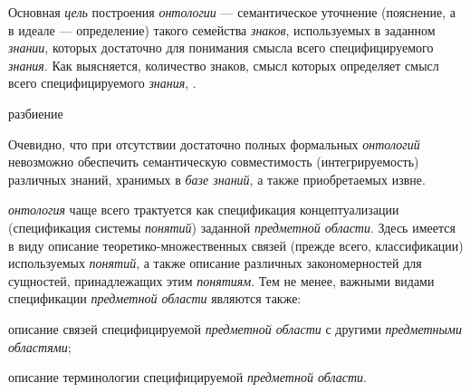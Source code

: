Основная \textit{цель} построения \textit{онтологии} --- семантическое уточнение (пояснение, а в идеале --- определение) такого семейства \textit{знаков}, используемых в заданном \textit{знании}, которых достаточно для понимания смысла всего специфицируемого \textit{знания}. Как выясняется, количество знаков, смысл которых определяет смысл всего специфицируемого \textit{знания}, .

\begin{SCn}
	\begin{scnrelfromset}{разбиение}
		\begin{scnindent}
		\end{scnindent}
	\end{scnrelfromset}
\end{SCn}

Очевидно, что при отсутствии достаточно полных формальных \textit{онтологий} невозможно обеспечить семантическую совместимость (интегрируемость) различных знаний, хранимых в \textit{базе знаний}, а также приобретаемых извне.

\textit{онтология} чаще всего трактуется как спецификация концептуализации (спецификация системы \textit{понятий}) заданной \textit{предметной области}. Здесь имеется в виду описание теоретико-множественных связей (прежде всего, классификации) используемых \textit{понятий}, а также описание различных закономерностей для сущностей, принадлежащих этим \textit{понятиям}. Тем не менее, важными видами спецификации \textit{предметной области} являются также:
\begin{textitemize}
	\item описание связей специфицируемой \textit{предметной области} с другими \textit{предметными областями};
	\item описание терминологии специфицируемой \textit{предметной области}.
\end{textitemize}

\begin{SCn}
\end{SCn}

